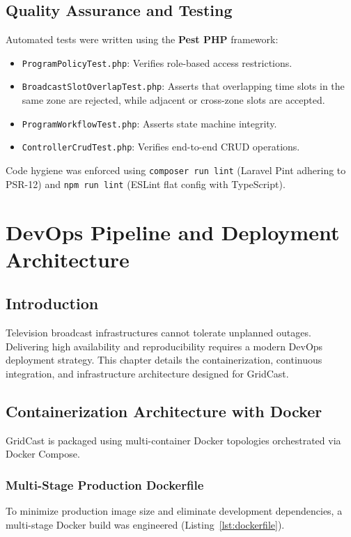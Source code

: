 \documentclass[12pt,a4paper,oneside]{report}
\begin{document}
\section{Quality Assurance and Testing}
Automated tests were written using the \textbf{Pest PHP} framework:
\begin{itemize}
    \item \texttt{ProgramPolicyTest.php}: Verifies role-based access restrictions.
    \item \texttt{BroadcastSlotOverlapTest.php}: Asserts that overlapping time slots in the same zone are rejected, while adjacent or cross-zone slots are accepted.
    \item \texttt{ProgramWorkflowTest.php}: Asserts state machine integrity.
    \item \texttt{ControllerCrudTest.php}: Verifies end-to-end CRUD operations.
\end{itemize}

Code hygiene was enforced using \texttt{composer run lint} (Laravel Pint adhering to PSR-12) and \texttt{npm run lint} (ESLint flat config with TypeScript).


\chapter{DevOps Pipeline and Deployment Architecture}
\label{chap:devops}

\section{Introduction}
Television broadcast infrastructures cannot tolerate unplanned outages. Delivering high availability and reproducibility requires a modern DevOps deployment strategy. This chapter details the containerization, continuous integration, and infrastructure architecture designed for GridCast.

\section{Containerization Architecture with Docker}
GridCast is packaged using multi-container Docker topologies orchestrated via Docker Compose.

\subsection{Multi-Stage Production Dockerfile}
To minimize production image size and eliminate development dependencies, a multi-stage Docker build was engineered (Listing~\ref{lst:dockerfile}).
\end{document}
